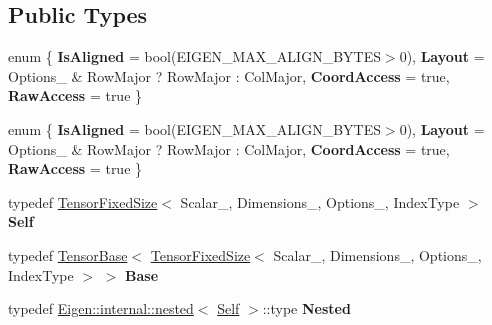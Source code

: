 \subsection*{Public Types}
\begin{DoxyCompactItemize}
\item 
\mbox{\label{class_eigen_1_1_tensor_fixed_size_aca0db746f493a20bbeaa96a17e36b415}} 
enum \{ {\bfseries Is\+Aligned} = bool(E\+I\+G\+E\+N\+\_\+\+M\+A\+X\+\_\+\+A\+L\+I\+G\+N\+\_\+\+B\+Y\+T\+ES$>$0), 
{\bfseries Layout} = Options\+\_\+ \& Row\+Major ? Row\+Major \+: Col\+Major, 
{\bfseries Coord\+Access} = true, 
{\bfseries Raw\+Access} = true
 \}
\item 
\mbox{\label{class_eigen_1_1_tensor_fixed_size_a796f8dcb92c0751e02fca524e94bd818}} 
enum \{ {\bfseries Is\+Aligned} = bool(E\+I\+G\+E\+N\+\_\+\+M\+A\+X\+\_\+\+A\+L\+I\+G\+N\+\_\+\+B\+Y\+T\+ES$>$0), 
{\bfseries Layout} = Options\+\_\+ \& Row\+Major ? Row\+Major \+: Col\+Major, 
{\bfseries Coord\+Access} = true, 
{\bfseries Raw\+Access} = true
 \}
\item 
\mbox{\label{class_eigen_1_1_tensor_fixed_size_a7a1b2d66554ac90311ed8da4b649f23a}} 
typedef \hyperlink{class_eigen_1_1_tensor_fixed_size}{Tensor\+Fixed\+Size}$<$ Scalar\+\_\+, Dimensions\+\_\+, Options\+\_\+, Index\+Type $>$ {\bfseries Self}
\item 
\mbox{\label{class_eigen_1_1_tensor_fixed_size_a265ab3158de7ea1fb7af56982a99f157}} 
typedef \hyperlink{class_eigen_1_1_tensor_base}{Tensor\+Base}$<$ \hyperlink{class_eigen_1_1_tensor_fixed_size}{Tensor\+Fixed\+Size}$<$ Scalar\+\_\+, Dimensions\+\_\+, Options\+\_\+, Index\+Type $>$ $>$ {\bfseries Base}
\item 
\mbox{\label{class_eigen_1_1_tensor_fixed_size_a493d8479135a88416b99aa83dec8d5fa}} 
typedef \hyperlink{struct_eigen_1_1internal_1_1nested}{Eigen\+::internal\+::nested}$<$ \hyperlink{class_eigen_1_1_tensor_fixed_size}{Self} $>$\+::type {\bfseries Nested}
\item 
\mbox{\label{class_eigen_1_1_tensor_fixed_size_abc19e8654428d0d1ef47591e716d1fa0}} 

\end{DoxyCompactItemize}
